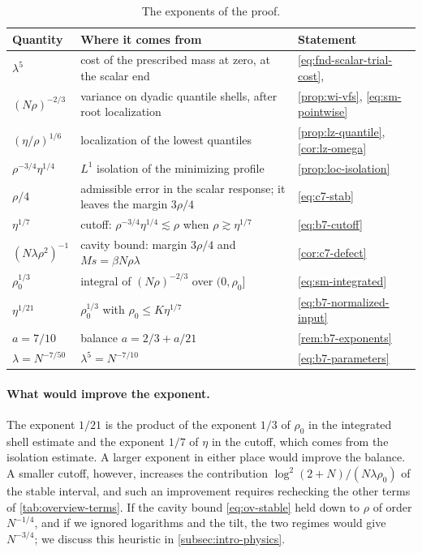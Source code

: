 \begin{table}[!tb]
\centering
\small
\begin{tabular}{@{}>{\raggedright\arraybackslash}p{}
 >{\raggedright\arraybackslash}p{}
 >{\raggedright\arraybackslash}p{}@{}}
\toprule
Quantity & Where it comes from & Statement\\
\midrule
$\lambda^5$ & cost of the prescribed mass at zero, at the scalar end
 & \eqref{eq:fnd-scalar-trial-cost}, \cite[Lemma~7.2]{AL}\\
$(N\rho)^{-2/3}$ & variance on dyadic quantile shells, after root
 localization & \cref{prop:wi-vfs}, \eqref{eq:sm-pointwise}\\
$(\eta/\rho)^{1/6}$ & localization of the lowest quantiles
 & \cref{prop:lz-quantile}, \cref{cor:lz-omega}\\
$\rho^{-3/4}\eta^{1/4}$ & $L^1$ isolation of the minimizing profile
 & \cref{prop:loc-isolation}\\
$\rho/4$ & admissible error in the scalar response; it leaves the
 margin $3\rho/4$ & \eqref{eq:c7-stab}\\
$\eta^{1/7}$ & cutoff: $\rho^{-3/4}\eta^{1/4}\lesssim\rho$ when
 $\rho\gtrsim\eta^{1/7}$ & \eqref{eq:b7-cutoff}\\
$(N\lambda\rho^2)^{-1}$ & cavity bound: margin $3\rho/4$ and
 $Ms=\beta N\rho\lambda$ & \cref{cor:c7-defect}\\
$\rho_0^{1/3}$ & integral of $(N\rho)^{-2/3}$ over $(0,\rho_0]$
 & \eqref{eq:sm-integrated}\\
$\eta^{1/21}$ & $\rho_0^{1/3}$ with $\rho_0\le K\eta^{1/7}$
 & \eqref{eq:b7-normalized-input}\\
$a=7/10$ & balance $a=2/3+a/21$ & \cref{rem:b7-exponents}\\
$\lambda=N^{-7/50}$ & $\lambda^5=N^{-7/10}$ & \eqref{eq:b7-parameters}\\
\bottomrule
\end{tabular}
\caption{The exponents of the proof.}
\label{tab:overview-exponents}
\end{table}

\paragraph{What would improve the exponent.}
The exponent $1/21$ is the product of the exponent $1/3$ of $\rho_0$ in
the integrated shell estimate and the exponent $1/7$ of $\eta$ in the
cutoff, which comes from the isolation estimate. A larger exponent in
either place would improve the balance. A smaller cutoff, however,
increases the contribution $\log^2(2+N)/(N\lambda\rho_0)$ of the stable
interval, and such an improvement requires rechecking the other
terms of \cref{tab:overview-terms}. If the cavity bound
\eqref{eq:ov-stable} held down to $\rho$ of order $N^{-1/4}$, and if we
ignored logarithms and the tilt, the two regimes would give $N^{-3/4}$;
we discuss this heuristic in \cref{subsec:intro-physics}.

